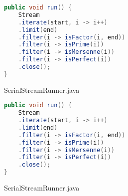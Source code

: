 \documentclass[]{report}
\begin{document}
\begin{figure}[h!]
	\caption{SerialStreamRunner.java}
	\begin{lstlisting}[language=Java,frame=single]
public void run() {
	Stream
	.iterate(start, i -> i++)
	.limit(end)
	.filter(i -> isFactor(i, end))
	.filter(i -> isPrime(i))
	.filter(i -> isMersenne(i))
	.filter(i -> isPerfect(i))
	.close();
}
	\end{lstlisting}
\end{figure}
\begin{figure}[h!]
	\caption{SerialStreamRunner.java}
	\begin{lstlisting}[language=Java,frame=single]
public void run() {
    Stream
    .iterate(start, i -> i++)
    .limit(end)
    .filter(i -> isFactor(i, end))
    .filter(i -> isPrime(i))
    .filter(i -> isMersenne(i))
    .filter(i -> isPerfect(i))
    .close();
}
	\end{lstlisting}
\end{figure}
\end{document}

